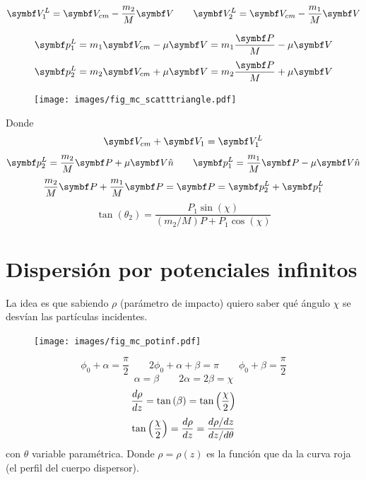 \documentclass[10pt,oneside]{CBFT_book}
\begin{document}
\[
	\vb{V}_1^L = \vb{V}_{cm} - \frac{m_2}{M} \vb{V}	\qquad \vb{V}_2^L = \vb{V}_{cm} - \frac{m_1}{M} \vb{V}
\]

\[
	\vb{p}_1^L = m_1 \vb{V}_{cm} - \mu \vb{V} = m_1 \frac{\vb{P}}{M} - \mu \vb{V}
\]
\[
	\vb{p}_2^L = m_2 \vb{V}_{cm} + \mu \vb{V} = m_2 \frac{\vb{P}}{M} + \mu \vb{V}
\]
\begin{figure}[htb]
	\begin{center}
	\texttt{[image: images/fig\_mc\_scatttriangle.pdf]}	 
	\end{center}
	\caption{}
\end{figure} 
Donde 
\[
	\vb{V}_{cm} + \vb{V}_1 = \vb{V}_1^L
\]
\[
	\vb{p}_2^L = \frac{m_2}{M} \vb{P} + \mu \vb{V}\hat{n}		\qquad	 \vb{p}_1^L = \frac{m_1}{M} \vb{P} - \mu \vb{V}\hat{n}
\]
\[
	\frac{m_2}{M} \vb{P} + \frac{m_1}{M} \vb{P} = \vb{P} = \vb{p}_2^L + \vb{p}_1^L
\]
\[
	\tan(\theta_2) = \frac{P_1 \sin(\chi)}{ (m_2/M) P + P_1\cos(\chi)}
\]

\section{Dispersión por potenciales infinitos}

La idea es que sabiendo $\rho$ (parámetro de impacto) quiero saber qué ángulo $\chi$ se desvían las
partículas incidentes.
\begin{figure}[htb]
	\begin{center}
	\texttt{[image: images/fig\_mc\_potinf.pdf]}	 
	\end{center}
	\caption{}
\end{figure} 
\[
	\phi_0 + \alpha = \frac{\pi}{2}		\qquad		2 \phi_0 + \alpha + \beta = \pi
	\qquad \phi_0 + \beta = \frac{\pi}{2}
\]
\[
	\alpha = \beta		\qquad 		2\alpha = 2\beta = \chi
\]
\[
	\frac{d^{\hspace{-0.05em}} {\rho}}{d {z}^{\hspace{-0.05em}}} = \tan \left(\beta \right) = \tan\left(\frac{\chi}{2}\right)
\]
\[
	\tan\left(\frac{\chi}{2}\right) = \frac{d^{\hspace{-0.05em}} {\rho}}{d {z}^{\hspace{-0.05em}}} = \frac{ d\rho/dz }{ dz/d\theta }
\]
con $\theta$ variable paramétrica. Donde $\rho = \rho(z)$ es la función que da la curva roja (el perfil
del cuerpo dispersor).




\end{document}
